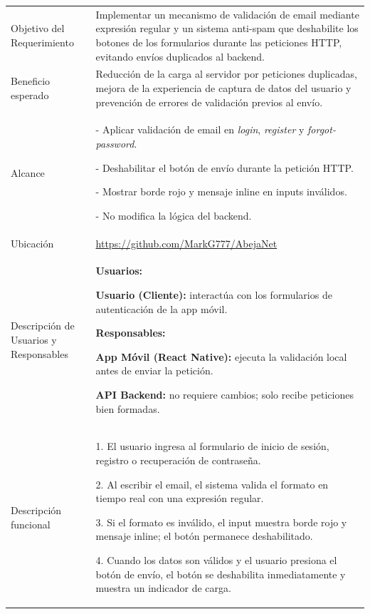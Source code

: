 \noindent
\begin{tabular}{|p{4.5cm}|p{11cm}|}
\hline
\rowcolor{secVerde}\multicolumn{2}{|l|}{\color{white}\textbf{3. DESCRIPCIÓN DEL REQUERIMIENTO}} \\
\hline
Objetivo del Requerimiento &
Implementar un mecanismo de validación de email mediante expresión regular y un sistema anti-spam que deshabilite los botones de los formularios durante las peticiones HTTP, evitando envíos duplicados al backend. \\
\hline
Beneficio esperado &
Reducción de la carga al servidor por peticiones duplicadas, mejora de la experiencia de captura de datos del usuario y prevención de errores de validación previos al envío. \\
\hline
Alcance &
- Aplicar validación de email en \textit{login}, \textit{register} y \textit{forgot-password}. \par
- Deshabilitar el botón de envío durante la petición HTTP. \par
- Mostrar borde rojo y mensaje inline en inputs inválidos. \par
- No modifica la lógica del backend. \\
\hline
Ubicación &
\url{https://github.com/MarkG777/AbejaNet} \\
\hline
Descripción de Usuarios y Responsables &
\textbf{Usuarios:} \par
\textbf{Usuario (Cliente):} interactúa con los formularios de autenticación de la app móvil. \par
\vspace{0.1cm}
\textbf{Responsables:} \par
\textbf{App Móvil (React Native):} ejecuta la validación local antes de enviar la petición. \par
\textbf{API Backend:} no requiere cambios; solo recibe peticiones bien formadas. \\
\hline
Descripción funcional &
1. El usuario ingresa al formulario de inicio de sesión, registro o recuperación de contraseña. \par
2. Al escribir el email, el sistema valida el formato en tiempo real con una expresión regular. \par
3. Si el formato es inválido, el input muestra borde rojo y mensaje inline; el botón permanece deshabilitado. \par
4. Cuando los datos son válidos y el usuario presiona el botón de envío, el botón se deshabilita inmediatamente y muestra un indicador de carga. \par

\end{tabular}
